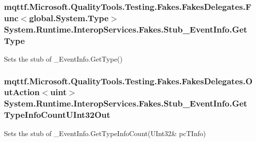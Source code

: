 \hypertarget{class_system_1_1_runtime_1_1_interop_services_1_1_fakes_1_1_stub___event_info_a0ecc162ae66dd8571fe9cb3c1b238f5b}{
\subsubsection[{Get\-Type}]{\setlength{\rightskip}{0pt plus 5cm}mqttf.\-Microsoft.\-Quality\-Tools.\-Testing.\-Fakes.\-Fakes\-Delegates.\-Func$<$global.\-System.\-Type$>$ System.\-Runtime.\-Interop\-Services.\-Fakes.\-Stub\-\_\-\-Event\-Info.\-Get\-Type}}\label{class_system_1_1_runtime_1_1_interop_services_1_1_fakes_1_1_stub___event_info_a0ecc162ae66dd8571fe9cb3c1b238f5b}


Sets the stub of \-\_\-\-Event\-Info.\-Get\-Type()

\hypertarget{class_system_1_1_runtime_1_1_interop_services_1_1_fakes_1_1_stub___event_info_a7aeca9f21c90e5a696a56faf7c75d651}{
\subsubsection[{Get\-Type\-Info\-Count\-U\-Int32\-Out}]{\setlength{\rightskip}{0pt plus 5cm}mqttf.\-Microsoft.\-Quality\-Tools.\-Testing.\-Fakes.\-Fakes\-Delegates.\-Out\-Action$<$uint$>$ System.\-Runtime.\-Interop\-Services.\-Fakes.\-Stub\-\_\-\-Event\-Info.\-Get\-Type\-Info\-Count\-U\-Int32\-Out}}\label{class_system_1_1_runtime_1_1_interop_services_1_1_fakes_1_1_stub___event_info_a7aeca9f21c90e5a696a56faf7c75d651}


Sets the stub of \-\_\-\-Event\-Info.\-Get\-Type\-Info\-Count(U\-Int32\& pc\-T\-Info)


